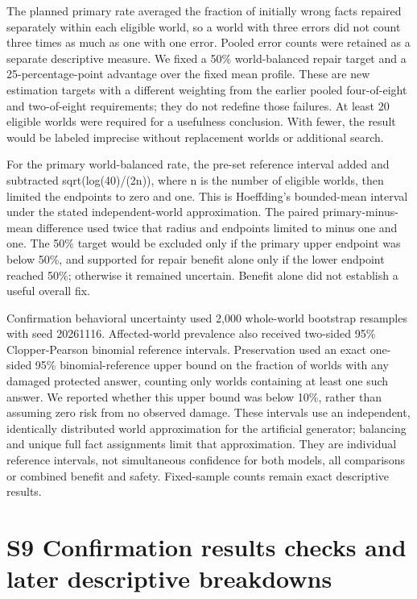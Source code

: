 \documentclass[10pt,letterpaper]{article}
\begin{document}
The planned primary rate averaged the fraction of initially wrong facts repaired separately within each eligible world, so a world with three errors did not count three times as much as one with one error. Pooled error counts were retained as a separate descriptive measure. We fixed a 50\% world-balanced repair target and a 25-percentage-point advantage over the fixed mean profile. These are new estimation targets with a different weighting from the earlier pooled four-of-eight and two-of-eight requirements; they do not redefine those failures. At least 20 eligible worlds were required for a usefulness conclusion. With fewer, the result would be labeled imprecise without replacement worlds or additional search.


For the primary world-balanced rate, the pre-set reference interval added and subtracted sqrt(log(40)/(2n)), where n is the number of eligible worlds, then limited the endpoints to zero and one. This is Hoeffding's bounded-mean interval under the stated independent-world approximation. The paired primary-minus-mean difference used twice that radius and endpoints limited to minus one and one. The 50\% target would be excluded only if the primary upper endpoint was below 50\%, and supported for repair benefit alone only if the lower endpoint reached 50\%; otherwise it remained uncertain. Benefit alone did not establish a useful overall fix.


Confirmation behavioral uncertainty used 2,000 whole-world bootstrap resamples with seed 20261116. Affected-world prevalence also received two-sided 95\% Clopper-Pearson binomial reference intervals. Preservation used an exact one-sided 95\% binomial-reference upper bound on the fraction of worlds with any damaged protected answer, counting only worlds containing at least one such answer. We reported whether this upper bound was below 10\%, rather than assuming zero risk from no observed damage. These intervals use an independent, identically distributed world approximation for the artificial generator; balancing and unique full fact assignments limit that approximation. They are individual reference intervals, not simultaneous confidence for both models, all comparisons or combined benefit and safety. Fixed-sample counts remain exact descriptive results.


\section*{S9 Confirmation results checks and later descriptive breakdowns}
\end{document}
